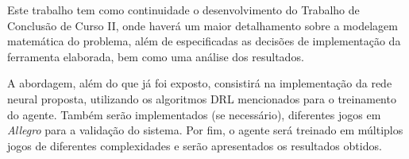 Este trabalho tem como continuidade o desenvolvimento do Trabalho de Conclusão de Curso II, onde haverá um maior detalhamento sobre a modelagem matemática do problema, além de especificadas as decisões de implementação da ferramenta elaborada, bem como uma análise dos resultados.

A abordagem, além do que já foi exposto, consistirá na implementação da rede neural proposta, utilizando os algoritmos DRL mencionados para o treinamento do agente. Também serão implementados (se necessário), diferentes jogos em \textit{Allegro} para a validação do sistema. Por fim, o agente será treinado em múltiplos jogos de diferentes complexidades e serão apresentados os resultados obtidos.


